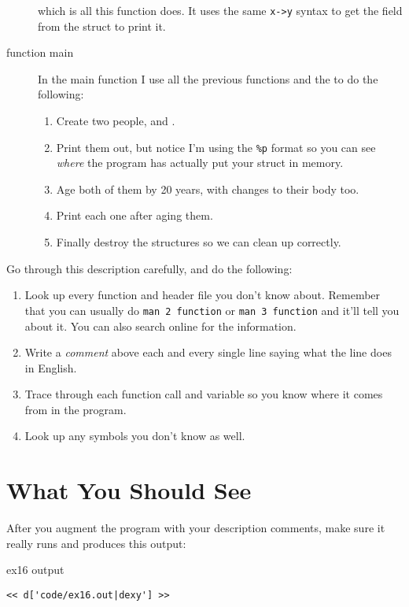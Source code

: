 \begin{description}
    which is all this function does.  It uses the same \verb|x->y|
    syntax to get the field from the struct to print it.
\item[function main] In the main function I use all the previous
    functions and the  to do the following:
    \begin{enumerate}
    \item Create two people,  and .
    \item Print them out, but notice I'm using the \verb|%p| 
        format so you can see \emph{where} the program
        has actually put your struct in memory.
    \item Age both of them by 20 years, with changes to their
        body too.
    \item Print each one after aging them.
    \item Finally destroy the structures so we can clean up 
        correctly.
    \end{enumerate}
\end{description}

Go through this description carefully, and do the following:

\begin{enumerate}
\item Look up every function and header file you don't know about.
    Remember that you can usually do \verb|man 2 function| or
    \verb|man 3 function| and it'll tell you about it.  You can also
    search online for the information.
\item Write a \emph{comment} above each and every single line saying
    what the line does in English.
\item Trace through each function call and variable so you know where
    it comes from in the program.
\item Look up any symbols you don't know as well.
\end{enumerate}


\section{What You Should See}

After you augment the program with your description comments,
make sure it really runs and produces this output:

\begin{code}{ex16 output}
\begin{lstlisting}
<< d['code/ex16.out|dexy'] >>
\end{lstlisting}
\end{code}

